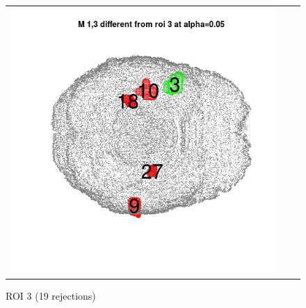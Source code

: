 \documentclass[12pt]{article}
\begin{document}
\begin{figure}[h]
\begin{tabular}{ccc}
\includegraphics[scale = 0.24]{../a7plots/d_3r_3_view3.png} \\ 
\end{tabular}
\caption{ROI 3 (19 rejections)}
\end{figure}
\end{document}
